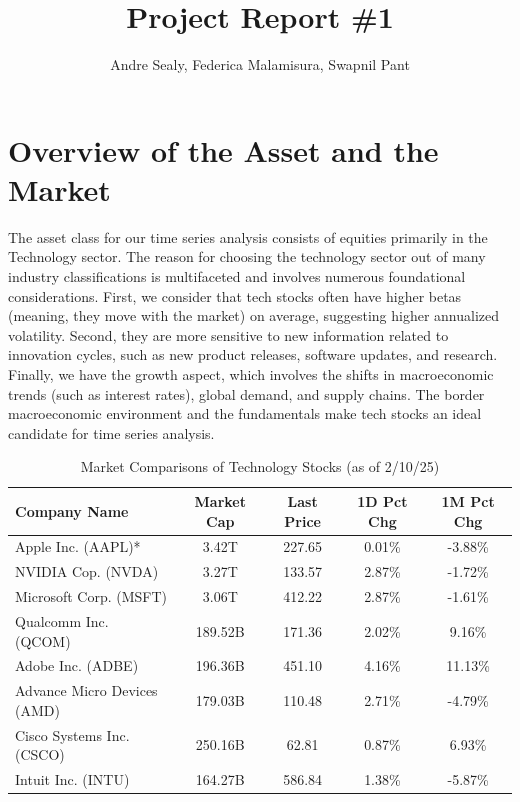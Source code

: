 \documentclass[12pt]{article}
\title{Project Report \#1}
\author{Andre Sealy, Federica Malamisura, Swapnil Pant}
\begin{document}
	
\maketitle

\section{Overview of the Asset and the Market}

The asset class for our time series analysis consists of equities primarily in the Technology sector. The reason for choosing the technology sector out of many industry classifications is multifaceted and involves numerous foundational considerations. First, we consider that tech stocks often have higher betas (meaning, they move with the market) on average, suggesting higher annualized volatility. Second, they are more sensitive to new information related to innovation cycles, such as new product releases, software updates, and research. Finally, we have the growth aspect, which involves the shifts in macroeconomic trends (such as interest rates), global demand, and supply chains. The border macroeconomic environment and the fundamentals make tech stocks an ideal candidate for time series analysis.

\begin{table}[ht]
	\centering
	\caption{Market Comparisons of Technology Stocks (as of 2/10/25)}
	\begin{tabular}[t]{lcccc}
		\toprule
		Company Name & Market Cap & Last Price & 1D Pct Chg& 1M Pct Chg \\
		\midrule
		Apple Inc. (AAPL)* & 3.42T&227.65&0.01\%&-3.88\%\\
		NVIDIA Cop. (NVDA) & 3.27T&133.57&2.87\%&-1.72\% \\
		Microsoft Corp. (MSFT) & 3.06T &412.22&2.87\%&-1.61\%  \\
		Qualcomm Inc. (QCOM) & 189.52B &171.36&2.02\%&9.16\%  \\
		Adobe Inc. (ADBE) & 196.36B	&451.10&4.16\%&11.13\% \\	   
		Advance Micro Devices (AMD) & 179.03B&110.48&2.71\%&-4.79\% \\
		Cisco Systems Inc. (CSCO) & 250.16B & 62.81 & 0.87\% & 6.93\%\\
		Intuit Inc. (INTU) & 164.27B & 586.84 & 1.38\% & -5.87\% \\ 				   
		\bottomrule
	\end{tabular}\label{tab:market_of_tech}
\end{table}
\end{document}
